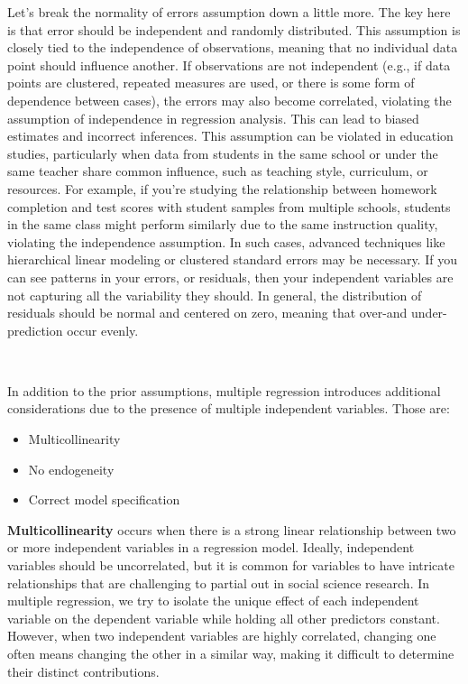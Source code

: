\documentclass[
  letterpaper,
  DIV=11,
  numbers=noendperiod]{scrreprt}
\begin{document}
Let's break the normality of errors assumption down a little more. The
key here is that error should be independent and randomly distributed.
This assumption is closely tied to the independence of observations,
meaning that no individual data point should influence another. If
observations are not independent (e.g., if data points are clustered,
repeated measures are used, or there is some form of dependence between
cases), the errors may also become correlated, violating the assumption
of independence in regression analysis. This can lead to biased
estimates and incorrect inferences. This assumption can be violated in
education studies, particularly when data from students in the same
school or under the same teacher share common influence, such as
teaching style, curriculum, or resources. For example, if you're
studying the relationship between homework completion and test scores
with student samples from multiple schools, students in the same class
might perform similarly due to the same instruction quality, violating
the independence assumption. In such cases, advanced techniques like
hierarchical linear modeling or clustered standard errors may be
necessary. If you can see patterns in your errors, or residuals, then
your independent variables are not capturing all the variability they
should. In general, the distribution of residuals should be normal and
centered on zero, meaning that over-and under-prediction occur evenly.

\,

In addition to the prior assumptions, multiple regression introduces
additional considerations due to the presence of multiple independent
variables. Those are:

\begin{itemize}
\item
  Multicollinearity
\item
  No endogeneity
\item
  Correct model specification
\end{itemize}

\textbf{Multicollinearity} occurs when there is a strong linear
relationship between two or more independent variables in a regression
model. Ideally, independent variables should be uncorrelated, but it is
common for variables to have intricate relationships that are
challenging to partial out in social science research. In multiple
regression, we try to isolate the unique effect of each independent
variable on the dependent variable while holding all other predictors
constant. However, when two independent variables are highly correlated,
changing one often means changing the other in a similar way, making it
difficult to determine their distinct contributions.\,\,
\end{document}
